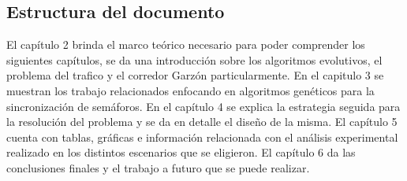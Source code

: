 \subsection{Estructura del documento}
El capítulo 2 brinda el marco teórico necesario para poder comprender los siguientes capítulos, se da una introducción sobre los algoritmos evolutivos, el problema del trafico y el corredor Garzón particularmente.
En el capitulo 3 se muestran los trabajo relacionados enfocando en algoritmos genéticos para la sincronización de semáforos.
En el capítulo 4 se explica la estrategia seguida para la resolución del problema y se da en detalle el diseño de la misma.
El capítulo 5 cuenta con tablas, gráficas e información relacionada con el análisis experimental realizado en los distintos escenarios que se eligieron.
El capítulo 6 da las conclusiones finales y el trabajo a futuro que se puede realizar.






